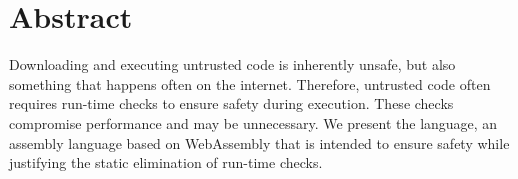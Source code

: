 \chapter{Abstract}
Downloading and executing untrusted code is inherently unsafe, but also something that happens often on the internet.
Therefore, untrusted code often requires run-time checks to ensure safety during execution.
These checks compromise performance and may be unnecessary.
We present the \name language, an assembly language based on WebAssembly that is intended to ensure safety while justifying the static elimination of run-time checks.